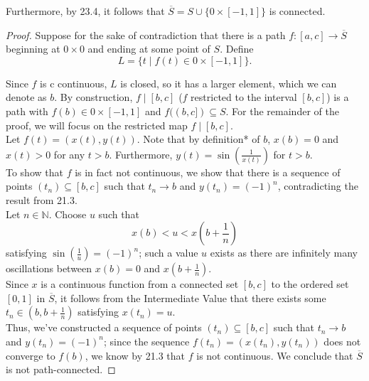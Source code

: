 \documentclass[11pt]{article}
\begin{document}
Furthermore, by  23.4, it follows that $\overline{S} = S \cup \{ 0 \times [-1, 1] \}$ is connected.
\begin{proof}
Suppose for the sake of contradiction that there is a path $f \colon [a, c] \rightarrow \overline{S}$ beginning at $0 \times 0$ and ending at some point of $S$. Define
\[
    L = \{ t \mid f(t) \in 0 \times [-1, 1]\}.
\]

Since $f$ is c continuous, $L$ is closed, so it has a larger element, which we can denote as $b$. By construction, $f \mid [b, c]$ ($f$ restricted to the interval $[b, c]$) is a path with $f(b) \in 0 \times [-1, 1]$ and $f((b ,c]) \subseteq S$. For the remainder of the proof, we will focus on the restricted map $f \mid [b, c]$.\\

Let $f(t) = (x(t), y(t))$. Note that by definition* of $b$, $x(b) = 0$ and $x(t) > 0$ for any $t > b$. Furthermore, $y(t) = \sin\left( \frac{1}{x(t)}\right)$ for $t > b$. \\

To show that $f$ is in fact not continuous, we show that there is a sequence of points $(t_n) \subseteq [b, c]$ such that $t_n \rightarrow b$ and $y(t_n) = (-1)^n$, contradicting the result from  21.3. \\

Let $n \in \mathbb{N}$. Choose $u$ such that 
\[
    x(b) < u < x\left( b + \frac{1}{n}\right)
\]
satisfying $\sin \left( \frac{1}{u} \right) = (-1)^n$; such a value $u$ exists as there are infinitely many oscillations between $x(b) = 0$ and $x\left( b + \frac{1}{n}\right)$. \\

Since $x$ is a continuous function from a connected set $[b, c]$ to the ordered set $[0, 1]$ in $\overline{S}$, it follows from the Intermediate Value  that there exists some $t_n \in \left(b, b + \frac{1}{n}\right)$ satisfying $x(t_n) = u$. \\

Thus, we've constructed a sequence of points $(t_n) \subseteq [b, c]$ such that $t_n \rightarrow b$ and $y(t_n) = (-1)^n$; since the sequence $f(t_n) = (x(t_n), y(t_n))$ does not converge to $f(b)$, we know by  21.3 that $f$ is not continuous. We conclude that $\overline{S}$ is not path-connected.
\end{proof}
\end{document}
